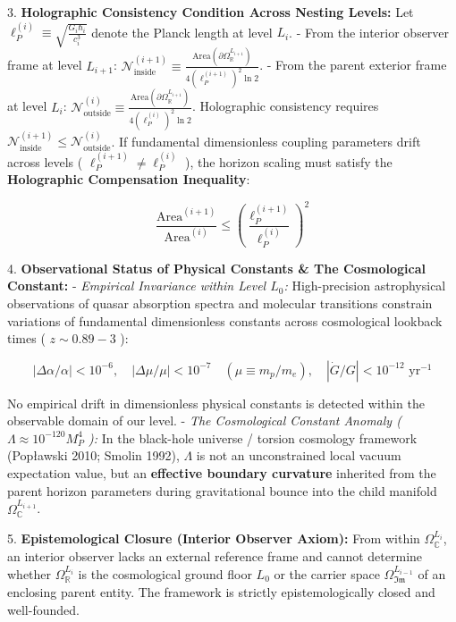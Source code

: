 \documentclass[11pt,a4paper]{article}
\theoremstyle{definition}
\theoremstyle{remark}
\begin{document}
3. \textbf{Holographic Consistency Condition Across Nesting Levels:}
Let $\ell_P^{(i)} \equiv \sqrt{\frac{G_i \hbar_i}{c_i^3}}$ denote the Planck length at level $L_i$.
- From the interior observer frame at level $L_{i+1}$: $\mathcal{N}_{\text{inside}}^{(i+1)} \equiv \frac{\mathrm{Area}(\partial \Omega_\mathbb{R}^{L_{i+1}})}{4 (\ell_P^{(i+1)})^2 \ln 2}$.
- From the parent exterior frame at level $L_i$: $\mathcal{N}_{\text{outside}}^{(i)} \equiv \frac{\mathrm{Area}(\partial \Omega_\mathbb{R}^{L_{i+1}})}{4 (\ell_P^{(i)})^2 \ln 2}$.
Holographic consistency requires $\mathcal{N}_{\text{inside}}^{(i+1)} \le \mathcal{N}_{\text{outside}}^{(i)}$. If fundamental dimensionless coupling parameters drift across levels ( $\ell_P^{(i+1)} \neq \ell_P^{(i)}$ ), the horizon scaling must satisfy the \textbf{Holographic Compensation Inequality}:


\begin{equation}
\boxed{\frac{\mathrm{Area}^{(i+1)}}{\mathrm{Area}^{(i)}} \le \left(\frac{\ell_P^{(i+1)}}{\ell_P^{(i)}}\right)^2}
\end{equation}


4. \textbf{Observational Status of Physical Constants \& The Cosmological Constant:}
- \textit{Empirical Invariance within Level $L_0$:} High-precision astrophysical observations of quasar absorption spectra and molecular transitions constrain variations of fundamental dimensionless constants across cosmological lookback times ( $z \sim 0.89 - 3$ ):


\begin{equation}
|\Delta \alpha / \alpha| < 10^{-6}, \quad |\Delta \mu / \mu| < 10^{-7} \quad (\mu \equiv m_p / m_e), \quad |\dot{G}/G| < 10^{-12} \text{ yr}^{-1}
\end{equation}


No empirical drift in dimensionless physical constants is detected within the observable domain of our level.
- \textit{The Cosmological Constant Anomaly ( $\Lambda \approx 10^{-120} M_P^4$ ):} In the black-hole universe / torsion cosmology framework (Popławski 2010; Smolin 1992), $\Lambda$ is not an unconstrained local vacuum expectation value, but an \textbf{effective boundary curvature} inherited from the parent horizon parameters during gravitational bounce into the child manifold $\Omega_\mathbb{C}^{L_{i+1}}$.

5. \textbf{Epistemological Closure (Interior Observer Axiom):}
From within $\Omega_\mathbb{C}^{L_i}$, an interior observer lacks an external reference frame and cannot determine whether $\Omega_\mathbb{R}^{L_i}$ is the cosmological ground floor $L_0$ or the carrier space $\Omega_{\mathfrak{Im}}^{L_{i-1}}$ of an enclosing parent entity. The framework is strictly epistemologically closed and well-founded.
\end{document}
